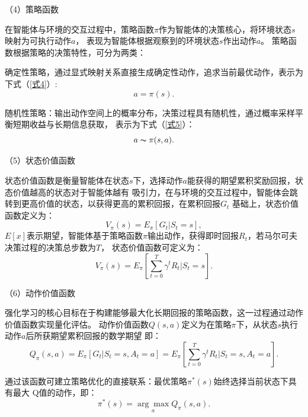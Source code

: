 （4）策略函数

在智能体与环境的交互过程中，策略函数$\pi $作为智能体的决策核心，将环境状态$s$映射为可执行动作$a$，
表现为智能体根据观察到的环境状态$s$作出动作$a$。
策略函数根据策略的决策特性，可分为两类：

确定性策略，通过显式映射关系直接生成确定性动作，追求当前最优动作，表示为下式（\ref{式4}）:
\begin{equation}\label{式4}
    a = \pi (s ).   
\end{equation}

随机性策略：输出动作空间上的概率分布，决策过程具有随机性，通过概率采样平衡短期收益与长期信息获取，
表示为下式（\ref{式5}）：
\begin{equation}\label{式5}
    a \thicksim  \pi (s,a).
\end{equation}

（5）状态价值函数

状态价值函数是衡量智能体在状态$s$下，选择动作$a$能获得的期望累积奖励回报，状态价值越高的状态对于智能体越有
吸引力，在与环境的交互过程中，智能体会跳转到更高价值的状态，以获得更高的累积回报，在累积回报$G_{t}$
基础上，状态价值函数定义为：
\begin{equation}\label{式6}
    V_{\pi }( s) = E_{\pi}[ G_{t}| S_{t}=s], 
\end{equation}
$E[x]$表示期望，智能体基于策略函数$\pi$输出动作，获得即时回报$R_{t}$，若马尔可夫决策过程的决策总步数为$T$，
状态价值函数可定义为：
\begin{equation}\label{式7}
    V_{\pi }( s) = E_{\pi}[ \sum_{t = 0}^{T} \gamma ^tR_{t} | S_{t}=s]. 
\end{equation}

（6）动作价值函数

强化学习的核心目标在于构建能够最大化长期回报的策略函数，这一过程通过动作价值函数实现量化评估。
动作价值函数$Q(s,a)$定义为在策略$\pi$下，从状态$s$执行动作$a$后所获期望累积回报的数学期望
即：
\begin{equation}\label{式8}
    Q_{\pi }( s,a) = E_{\pi}[ G_{t} | S_{t}=s,A_{t}=a] = E_{\pi}[\sum_{t = 0}^{T} \gamma ^tR_{t} | S_{t}=s,A_{t}=a].
\end{equation}

通过该函数可建立策略优化的直接联系：最优策略$\pi^*(s)$始终选择当前状态下具有最大
Q值的动作，即：
\begin{equation}\label{式9}
    \pi^*(s) = \underset{a}{\arg\max}Q_{\pi }( s,a).
\end{equation}

